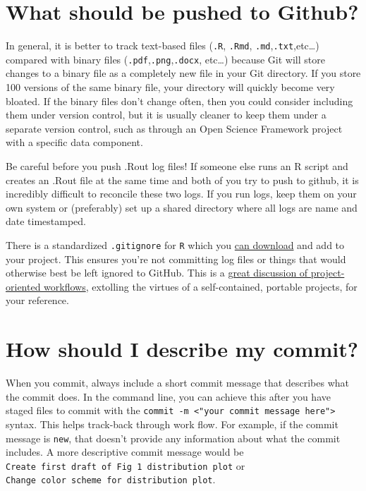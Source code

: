 \documentclass[]{book}
\begin{document}
\hypertarget{what-should-be-pushed-to-github}{%
\section{What should be pushed to Github?}\label{what-should-be-pushed-to-github}}

In general, it is better to track text-based files (\texttt{.R}, \texttt{.Rmd}, \texttt{.md},\texttt{.txt},etc\ldots) compared with binary files (\texttt{.pdf},\texttt{.png},\texttt{.docx}, etc\ldots) because Git will store changes to a binary file as a completely new file in your Git directory. If you store 100 versions of the same binary file, your directory will quickly become very bloated. If the binary files don't change often, then you could consider including them under version control, but it is usually cleaner to keep them under a separate version control, such as through an Open Science Framework project with a specific data component.

Be careful before you push .Rout log files! If someone else runs an R script and creates an .Rout file at the same time and both of you try to push to github, it is incredibly difficult to reconcile these two logs. If you run logs, keep them on your own system or (preferably) set up a shared directory where all logs are name and date timestamped.

There is a standardized \texttt{.gitignore} for \texttt{R} which you \href{https://github.com/github/gitignore/blob/master/R.gitignore}{can download} and add to your project. This ensures you're not committing log files or things that would otherwise best be left ignored to GitHub. This is a \href{https://www.tidyverse.org/articles/2017/12/workflow-vs-script/}{great discussion of project-oriented workflows}, extolling the virtues of a self-contained, portable projects, for your reference.

\hypertarget{how-should-i-describe-my-commit}{%
\section{How should I describe my commit?}\label{how-should-i-describe-my-commit}}

When you commit, always include a short commit message that describes what the commit does. In the command line, you can achieve this after you have staged files to commit with the \texttt{commit\ -m\ \textless{}"your\ commit\ message\ here"\textgreater{}} syntax. This helps track-back through work flow. For example, if the commit message is \texttt{new}, that doesn't provide any information about what the commit includes. A more descriptive commit message would be \texttt{Create\ first\ draft\ of\ Fig\ 1\ distribution\ plot} or \texttt{Change\ color\ scheme\ for\ distribution\ plot}.
\end{document}
